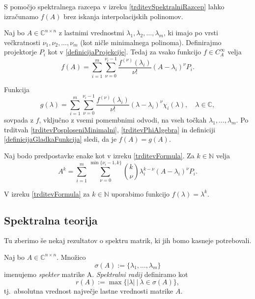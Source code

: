 \documentclass[mat1]{fmfdelo}
\newcommand{\N}{\mathbb N}
\newcommand{\C}{\mathbb C}
\begin{document}
S pomočjo spektralnega razcepa v izreku \ref{trditevSpektralniRazcep} lahko izračunamo $f(A)$ brez iskanja interpolacijskih polinomov.
\begin{izrek} \label{trditevFormula}
    Naj bo $A \in \C^{n \times n}$ z lastnimi vrednostmi $\lambda_1, \lambda_2, \ldots, \lambda_m$, ki imajo po vrsti večkratnosti $\nu_1, \nu_2, \ldots, \nu_m$ (kot ničle minimalnega polinoma). Definirajmo projektorje $P_i$ kot v \eqref{definicijaProjekcije}. Tedaj za vsako funkcijo $f \in C_A^\infty$ velja
    \begin{equation*}
        f(A) = \sum_{i=1}^m \sum_{\nu = 0}^{\nu_i - 1} \frac{f^{(\nu)}(\lambda_i)}{\nu !}(A - \lambda_i)^\nu P_i.
    \end{equation*}
\end{izrek}
\begin{dokaz}
    Funkcija
    \begin{equation*}
        g(\lambda) = \sum_{i=1}^m \sum_{\nu = 0}^{\nu_i - 1} \frac{f^{(\nu)}(\lambda_i)}{\nu !}(\lambda - \lambda_i)^\nu \chi_i(\lambda), \quad \lambda \in \C,
    \end{equation*}
    sovpada z $f$, vključno z vsemi pomembnimi odvodi, na vseh točkah $\lambda_1, \ldots, \lambda_m$.  Po trditvah \ref{trditevPosploseniMinimalni}, \ref{trditevPhiAlgebra} in definiciji \ref{definicijaGladkaFunkcija} sledi, da je $f(A) = g(A)$.
\end{dokaz}
\begin{posledica}
    Naj bodo predpostavke enake kot v izreku \ref{trditevFormula}. Za $k \in \N$ velja
    \begin{equation}\label{formulaMatricnePotence}
        A^k = \sum_{i=1}^m \sum_{\nu = 0}^{\min \{\nu_i - 1, k\}} {k \choose \nu} \lambda_i^{k-\nu}(A - \lambda_i)^\nu P_i.
    \end{equation}
\end{posledica}
\begin{dokaz}
    V izreku \ref{trditevFormula} za $k \in \N$ uporabimo funkcijo $f(\lambda) = \lambda^k$.
\end{dokaz}

\subsection{Spektralna teorija}
Tu zberimo še nekaj rezultatov o spektru matrik, ki jih bomo kasneje potrebovali.
\begin{definicija}
    Naj bo $A \in \C^{n \times n}$. Množico
    \begin{equation*}
        \sigma(A) := \{\lambda_1, \ldots, \lambda_m\}
    \end{equation*}
    imenujemo \emph{spekter} matrike A. \emph{Spektralni radij} definiramo kot
    \begin{equation*}
        r(A) := \max \{|\lambda|\ |\ \lambda \in \sigma(A)\},
    \end{equation*}
    tj.\ absolutna vrednost največje lastne vrednosti matrike $A$.
\end{definicija}
\end{document}
